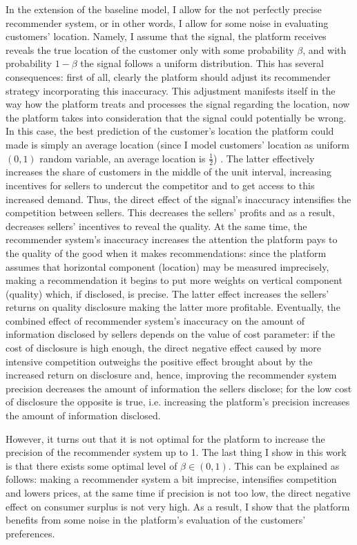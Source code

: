 \documentclass[a4paper]{article}
\begin{document}
	
	
	
In the extension of the baseline model, I allow for the not perfectly precise recommender system, or in other words, I allow for some noise in evaluating customers' location. Namely, I assume that the signal, the platform receives reveals the true location of the customer only with some probability $\beta$, and with probability $1 - \beta$ the signal follows a uniform distribution. This has several consequences: first of all, clearly the platform should adjust its recommender strategy incorporating this inaccuracy. This adjustment manifests itself in the way how the platform treats and processes the signal regarding the location, now the platform takes into consideration that the signal could potentially be wrong. In this case, the best prediction of the customer's location the platform could made is simply an average location (since I model customers' location as uniform $(0, 1)$ random variable, an average location is $\frac{1}{2}$) . The latter effectively increases the share of customers in the middle of the unit interval, increasing incentives for sellers to undercut the competitor and to get access to this increased demand. Thus, the direct effect of the signal's inaccuracy intensifies the competition between sellers. This decreases the sellers' profits and as a result, decreases sellers' incentives to reveal the quality. At the same time, the recommender system's inaccuracy increases the attention the platform pays to the quality of the good when it makes recommendations: since the platform assumes that horizontal component (location) may be measured imprecisely, making a recommendation it begins to put more weights on vertical component (quality) which, if disclosed, is precise. The latter effect increases the sellers' returns on quality disclosure making the latter more profitable. Eventually, the combined effect of recommender system's inaccuracy on the amount of information disclosed by sellers depends on the value of cost parameter: if the cost of disclosure is high enough, the direct negative effect caused by more intensive competition outweighs the positive effect brought about by the increased return on disclosure and, hence, improving the recommender system precision decreases the amount of information the sellers disclose; for the low cost of disclosure the opposite is true, i.e. increasing the platform's precision increases the amount of information disclosed. 
	
	
	
	
	
However, it turns out that it is not optimal for the platform to increase the precision of the recommender system up to 1. The last thing I show in this work is that there exists some optimal level of $\beta \in (0, 1)$. This can be explained as follows: making a recommender system a bit imprecise, intensifies competition and lowers prices, at the same time if precision is not too low, the direct negative effect on consumer surplus is not very high. As a result, I show that the platform benefits from some noise in the platform's evaluation of the customers' preferences.
\end{document}

